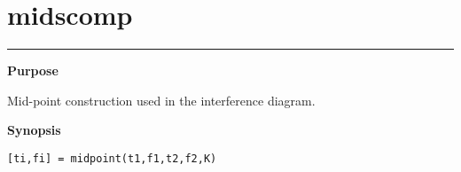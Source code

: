 

\section*{\hspace*{-1.6cm} midscomp}

\vspace*{-.4cm}
\hspace*{-1.6cm}\rule[0in]{16.5cm}{.02cm}
\vspace*{.2cm}


{\bf \large \sf Purpose}\\
\hspace*{1.5cm}
\begin{minipage}[t]{13.5cm}
Mid-point construction used in the interference diagram. 
\end{minipage}
\vspace*{.5cm}


{\bf \large \sf Synopsis}\\
\hspace*{1.5cm}
\begin{minipage}[t]{13.5cm}
\begin{verbatim}
[ti,fi] = midpoint(t1,f1,t2,f2,K)
\end{verbatim}
\end{minipage}
\vspace*{.5cm}


